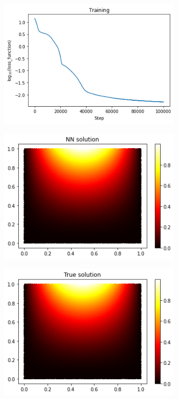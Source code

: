 \begin{figure}[H]
\begin{subfigure}{0.45\textwidth}
    \centering
    \includegraphics[width=.8\linewidth]{images/NN_Jax_PDE8_files_tanh/NN_Jax_PDE8_18_1.png}
    \label{fig:sub1}
\end{subfigure}%
\begin{subfigure}{0.45\textwidth}
    \centering
    \includegraphics[width=0.8\linewidth]{images/NN_Jax_PDE8_files_tanh/NN_Jax_PDE8_20_0.png}
    \label{fig:sub2}
\end{subfigure}
\newline
\begin{subfigure}{.45\textwidth}
    \centering
    \includegraphics[width=.8\linewidth]{images/NN_Jax_PDE8_files_tanh/NN_Jax_PDE8_22_0.png}

\end{subfigure}
\end{figure}
